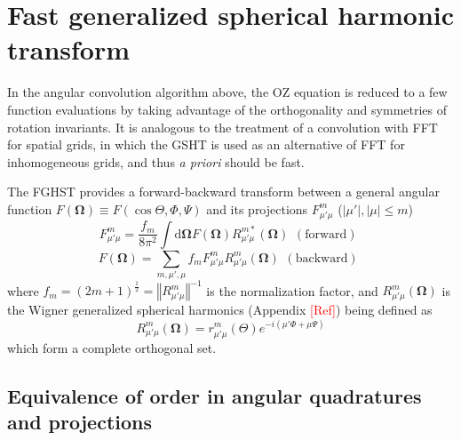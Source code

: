 \section{Fast generalized spherical harmonic transform}

In the angular convolution algorithm above, the OZ equation is reduced
to a few function evaluations by taking advantage of the orthogonality
and symmetries of rotation invariants. It is analogous to the treatment
of a convolution with FFT for spatial grids, in which the GSHT is used as an alternative of
FFT for inhomogeneous grids, and thus \textit{a priori }should be fast.

The FGHST provides a forward-backward transform between a general
angular function $F(\mathbf{\Omega})\equiv F(\cos\Theta,\Phi,\Psi)$
and its projections $F_{\mu'\mu}^{m}$ ($\left|\mu'\right|,\left|\mu\right|\leq m$)
\begin{equation}
F_{\mu'\mu}^{m}=\frac{f_{m}}{8\pi^{2}}\int\mathrm{d}\mathbf{\Omega}F(\mathbf{\Omega})R_{\mu'\mu}^{m*}(\mathbf{\Omega})\begin{array}{c}
\mathrm{(forward)}\end{array}\label{eq:GSHT_forward}
\end{equation}
\begin{equation}
F(\mathbf{\Omega})=\sum_{m,\mu',\mu}f_{m}F_{\mu'\mu}^{m}R_{\mu'\mu}^{m}(\mathbf{\Omega})\begin{array}{c}
\mathrm{(backward)}\end{array}\label{eq:GSHT_backward}
\end{equation}
where $f_{m}=\left(2m+1\right)^{\frac{1}{2}}=\left\Vert R_{\mu'\mu}^{m}\right\Vert ^{-1}$
is the normalization factor, and $R_{\mu'\mu}^{m}(\mathbf{\Omega})$
is the Wigner generalized spherical harmonics (Appendix \textcolor{red}{{[}Ref{]}})
being defined as
\begin{equation}
R_{\mu'\mu}^{m}(\mathbf{\Omega})=r_{\mu'\mu}^{m}(\Theta)e^{-i(\mu'\Phi+\mu\Psi)}
\end{equation}
which form a complete orthogonal set.


\subsection{Equivalence of order in angular quadratures and projections}

